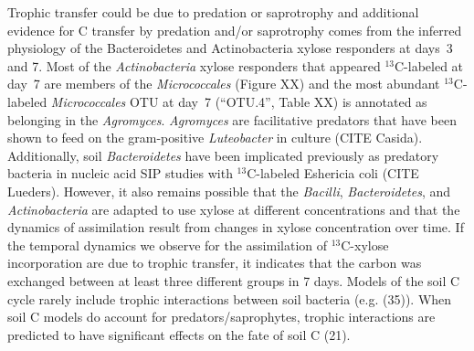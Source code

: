 Trophic transfer could be due to predation or saprotrophy and additional
evidence for C transfer by predation and/or saprotrophy comes from the
inferred physiology of the Bacteroidetes and Actinobacteria xylose responders
at days~3 and 7. Most of the \textit{Actinobacteria} xylose responders that
appeared $^{13}$C-labeled at day~7 are members of the \textit{Micrococcales} (Figure
XX) and the most abundant $^{13}$C-labeled \textit{Micrococcales} OTU at day~7
(“OTU.4”, Table XX) is annotated as belonging in the \textit{Agromyces}.
\textit{Agromyces} are facilitative predators that have been shown to feed on
the gram-positive \textit{Luteobacter} in culture (CITE Casida). Additionally,
soil \textit{Bacteroidetes} have been implicated previously as predatory
bacteria in nucleic acid SIP studies with $^{13}$C-labeled Eshericia coli (CITE
Lueders). However, it also remains possible that the \textit{Bacilli},
\textit{Bacteroidetes}, and \textit{Actinobacteria} are adapted to use xylose
at different concentrations and that the dynamics of assimilation result from
changes in xylose concentration over time. If the temporal dynamics we observe
for the assimilation of $^{13}$C-xylose incorporation are due to trophic transfer,
it indicates that the carbon was exchanged between at least three different
groups in 7 days. Models of the soil C cycle rarely include trophic
interactions between soil bacteria (e.g. (35)). When soil C models do account
for predators/saprophytes, trophic interactions are predicted to have
significant effects on the fate of soil C (21). 

